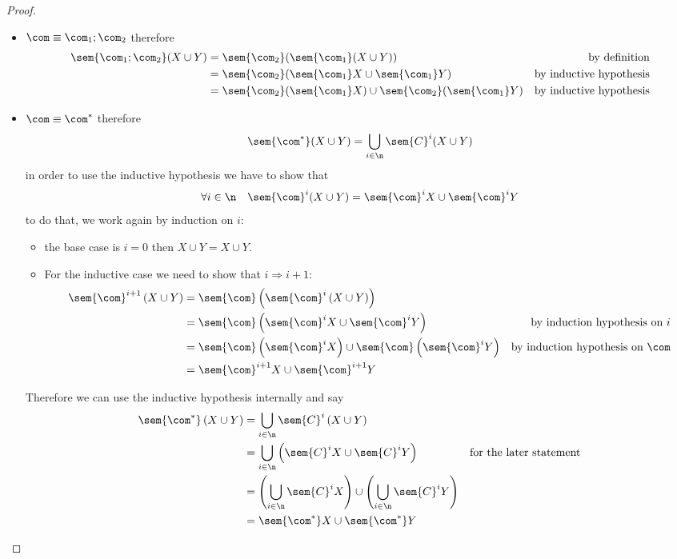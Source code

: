 \begin{proof}
\begin{itemize}
  \item \(\com \equiv \com_1; \com_2\) therefore
    \begin{align*}
      \sem{\com_1 ; \com_2}(X\cup Y) & = \sem{\com_2}(\sem{\com_1}(X \cup Y)) & \text{by definition}\\
                                     & = \sem{\com_2}(\sem{\com_1}X \cup \sem{\com_1}Y) & \text{by inductive hypothesis}\\
                                     & = \sem{\com_2}(\sem{\com_1}X) \cup \sem{\com_2}(\sem{\com_1}Y) & \text{by inductive hypothesis}
    \end{align*}
    
  \item \(\com \equiv \com^*\) therefore
    \[\sem{\com^*}(X\cup Y) = \bigcup_{i\in\n}\sem{C}^i(X\cup Y)\] in
    order to use the inductive hypothesis we have to show
    that
    \[\forall i \in \n \quad \sem{\com}^i(X \cup Y) = \sem{\com}^i X
      \cup \sem{\com}^i Y\] to do that, we work again by induction on
    \(i\):
    \begin{itemize}
    \item the base case is \(i = 0\) then \(X \cup Y = X \cup Y\).
    \item For the inductive case we need to show that
      \(i \Rightarrow i+1\):
      \begin{align*}
        \sem{\com}^{i+1}\left(X\cup Y\right) & = \sem{\com}\left(\sem{\com}^i \left(X \cup Y\right)\right) \\
                                             & = \sem{\com}\left(\sem{\com}^iX \cup \sem{\com}^iY\right) & \text{by induction hypothesis on } i \\
                                             & = \sem{\com}\left(\sem{\com}^iX\right) \cup \sem{\com}\left(\sem{\com}^iY\right) & \text{by induction hypothesis on } \com \\
                                             & = \sem{\com}^{i+1}X \cup \sem{\com}^{i+1}Y
      \end{align*}
    \end{itemize}
    Therefore we can use the inductive hypothesis internally and say
    \begin{align*}
      \sem{\com^*}\left(X\cup Y\right) & = \bigcup_{i\in\n}\sem{C}^i\left(X\cup Y\right) \\
                                       & = \bigcup_{i\in\n}\left(\sem{C}^iX \cup \sem{C}^iY\right) & \text{for the later statement} \\
                                       & = \left(\bigcup_{i\in\n}\sem{C}^iX\right) \cup \left(\bigcup_{i\in\n}\sem{C}^iY\right) \\
                                       & = \sem{\com^*}X \cup \sem{\com^*}Y \qedhere
    \end{align*}
  \end{itemize}
\end{proof}


